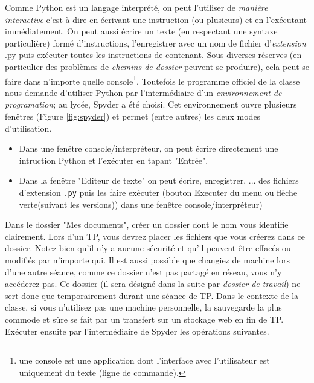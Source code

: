 Comme Python est un langage interprété, on peut l'utiliser de \emph{manière interactive} c'est à dire en écrivant une instruction (ou plusieurs) et en l'exécutant immédiatement. On peut aussi écrire un texte (en respectant une syntaxe particulière) formé d'instructions, l'enregistrer avec un nom de fichier d'\emph{extension} .py  puis exécuter toutes les instructions de contenant.\newline
Sous diverses réserves (en particulier des problèmes de \emph{chemins de dossier} peuvent se produire), cela peut se faire dans n'importe quelle console\footnote{une console est une application dont l'interface avec l'utilisateur est uniquement du texte (ligne de commande).}. Toutefois le programme officiel de la classe nous demande d'utiliser Python par l'intermédiaire d'un \emph{environnement de programation}; au lycée, Spyder a été choisi.\newline
Cet environnement ouvre plusieurs fenêtres (Figure \ref{fig:spyder}) et permet (entre autres) les deux modes d'utilisation.
\begin{itemize}
 \item Dans une fenêtre console/interpréteur, on peut écrire directement une intruction Python et l'exécuter en tapant "Entrée". 
 \item Dans la fenêtre "Editeur de texte" on peut écrire, enregistrer, ... des fichiers d'extension \verb|.py| puis les faire exécuter (bouton Executer du menu ou flèche verte(suivant les versions)) dans une fenêtre console/interpréteur)
\end{itemize}
Dans le dossier "Mes documents", créer un dossier dont le nom vous identifie clairement. Lors d'un TP, vous devrez placer les fichiers que vous créerez dans ce dossier. Notez bien qu'il n'y a aucune sécurité et qu'il peuvent être effacés ou modifiés par n'importe qui. Il est aussi possible que changiez de machine lors d'une autre séance, comme ce dossier n'est pas partagé en réseau, vous n'y accéderez pas. Ce dossier (il sera désigné dans la suite par \emph{dossier de travail}) ne sert donc que temporairement durant une séance de TP. Dans le contexte de la classe, si vous n'utilisez pas une machine personnelle, la sauvegarde la plus commode et sûre se fait par un transfert sur un stockage web en fin de TP.\newline
Exécuter ensuite par l'intermédiaire de Spyder les opérations suivantes.
